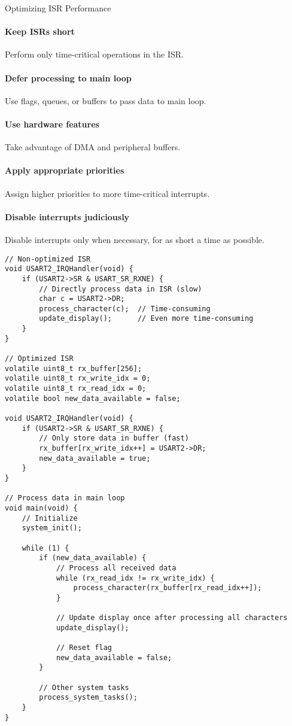 \begin{KR}{Optimizing ISR Performance}\\
\paragraph{Keep ISRs short}
Perform only time-critical operations in the ISR.
\paragraph{Defer processing to main loop}
Use flags, queues, or buffers to pass data to main loop.
\paragraph{Use hardware features}
Take advantage of DMA and peripheral buffers.
\paragraph{Apply appropriate priorities}
Assign higher priorities to more time-critical interrupts.
\paragraph{Disable interrupts judiciously}
Disable interrupts only when necessary, for as short a time as possible.

\begin{lstlisting}[style=basesmol]
// Non-optimized ISR
void USART2_IRQHandler(void) {
    if (USART2->SR & USART_SR_RXNE) {
        // Directly process data in ISR (slow)
        char c = USART2->DR;
        process_character(c);  // Time-consuming
        update_display();      // Even more time-consuming
    }
}

// Optimized ISR
volatile uint8_t rx_buffer[256];
volatile uint8_t rx_write_idx = 0;
volatile uint8_t rx_read_idx = 0;
volatile bool new_data_available = false;

void USART2_IRQHandler(void) {
    if (USART2->SR & USART_SR_RXNE) {
        // Only store data in buffer (fast)
        rx_buffer[rx_write_idx++] = USART2->DR;
        new_data_available = true;
    }
}

// Process data in main loop
void main(void) {
    // Initialize
    system_init();
    
    while (1) {
        if (new_data_available) {
            // Process all received data
            while (rx_read_idx != rx_write_idx) {
                process_character(rx_buffer[rx_read_idx++]);
            }
            
            // Update display once after processing all characters
            update_display();
            
            // Reset flag
            new_data_available = false;
        }
        
        // Other system tasks
        process_system_tasks();
    }
}
\end{lstlisting}
\end{KR}

